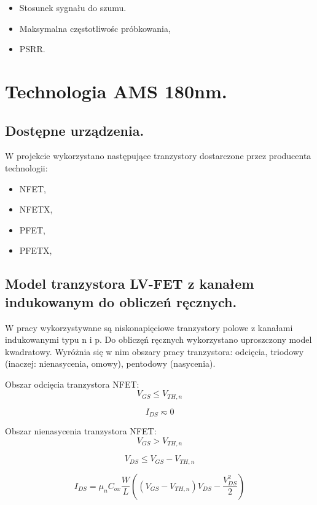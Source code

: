 \documentclass[10pt,a4paper]{report}
\begin{document}
	{
		\begin{itemize}
			\item Stosunek sygnału do szumu.
			\item Maksymalna częstotliwośc próbkowania,
			\item PSRR.
		\end{itemize} 
	}

	\chapter{Technologia AMS 180nm.}
	
	\section{Dostępne urządzenia.}
	{	W projekcie wykorzystano następujące tranzystory dostarczone przez producenta technologii:
		\begin{itemize}
			\item NFET,
			\item NFETX,
			\item PFET,
			\item PFETX,
		\end{itemize}
   }
	\section{Model tranzystora LV-FET z kanałem indukowanym do obliczeń ręcznych.}
	{ 	W pracy wykorzystywane są niskonapięciowe tranzystory polowe z kanałami indukowanymi typu n i p. Do obliczęń ręcznych wykorzystano uproszczony model kwadratowy. Wyróżnia się w nim obszary pracy tranzystora: odcięcia, triodowy (inaczej: nienasycenia, omowy), pentodowy (nasycenia). }
	
	{	Obszar odcięcia tranzystora NFET:
		\begin{equation}
			V_{GS} \leq V_{TH,n}
		\end{equation}
		
		\begin{equation}
			I_{DS} \eqsim 0
		\end{equation}
	}
	
	{	Obszar nienasycenia tranzystora NFET:
		\begin{equation}
			V_{GS} > V_{TH,n}
		\end{equation}
		
		\begin{equation}
			V_{DS} \leq V_{GS} - V_{TH,n}
		\end{equation}
		
		\begin{equation}
			I_{DS} = \mu_n C_{ox} \frac{W}{L} \left( \left(V_{GS} - V_{TH,n}\right) V_{DS} - \frac{V_{DS}^2}{2}  \right)
		\end{equation}
	}
\end{document}
